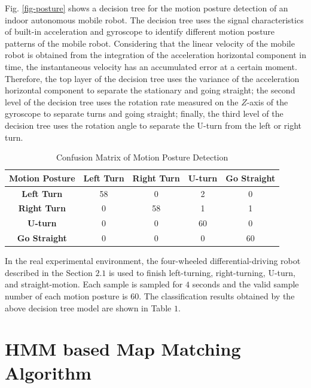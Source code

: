 \documentclass{llncs}
\begin{document}
Fig. \ref{fig-posture} shows a decision tree for the motion posture detection of an indoor autonomous mobile robot. The decision tree uses the signal characteristics of built-in acceleration and gyroscope to identify different motion posture patterns of the mobile robot. Considering that the linear velocity of the mobile robot is obtained from the integration of the acceleration horizontal component in time, the instantaneous velocity has an accumulated error at a certain moment. Therefore, the top layer of the decision tree uses the variance of the acceleration horizontal component to separate the stationary and going straight; the second level of the decision tree uses the rotation rate measured on the $Z$-axis of the gyroscope to separate turns and going straight; finally, the third level of the decision tree uses the rotation angle to separate the U-turn from the left or right turn.

\begin{table}
	\label{table_conf}
	\caption{Confusion Matrix of Motion Posture Detection}
	\begin{center}
		\begin{tabular}{| c || c | c | c | c |}
			\hline
			\bfseries Motion Posture & \bfseries Left Turn & \bfseries Right Turn & \bfseries U-turn & \bfseries Go Straight\\
			\hline\hline
			\bfseries Left Turn & 58 & 0 & 2 & 0 \\
			\hline
			\bfseries Right Turn & 0 & 58 & 1 & 1 \\
			\hline
			\bfseries U-turn & 0 & 0 & 60 & 0 \\
			\hline
			\bfseries Go Straight & 0 & 0 & 0 & 60 \\
			\hline
		\end{tabular}
	\end{center}
\end{table}

In the real experimental environment, the four-wheeled differential-driving robot described in the Section $2.1$ is used to finish left-turning, right-turning, U-turn, and straight-motion. Each sample is sampled for $4$ seconds and the valid sample number of each motion posture is $60$. The classification results obtained by the above decision tree model are shown in Table $1$.

\section{HMM based Map Matching Algorithm}
\end{document}
